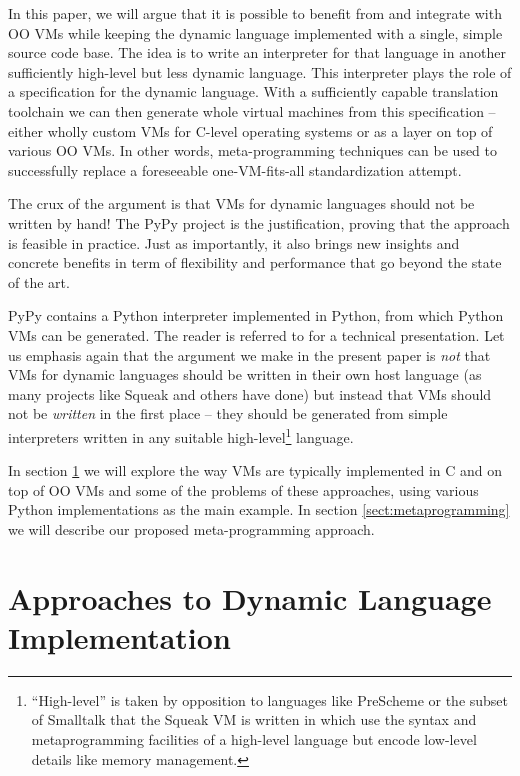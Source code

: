 \documentclass{llncs}
\begin{document}
In this paper, we will argue that it is possible to
benefit from and integrate with OO VMs while keeping the dynamic
language implemented with a single, simple source code base.  The idea is
to write an interpreter for that language in another sufficiently
high-level but less dynamic language.  This interpreter plays the role
of a specification for the dynamic language.  With a sufficiently capable
translation toolchain we can then generate whole virtual machines from
this specification -- either wholly custom VMs for C-level operating
systems or as a layer on top of various OO VMs.  In other words,
meta-programming techniques can be used to successfully replace a
foreseeable one-VM-fits-all standardization attempt.

The crux of the argument is that VMs for dynamic languages should not be
written by hand!  The PyPy project \cite{pypy} is the justification,
proving that the approach is
feasible in practice.  Just as importantly, it also brings new insights
and concrete benefits in term of flexibility and performance that go
beyond the state of the art.

PyPy contains a Python interpreter implemented in Python, from which
Python VMs can be generated.  The reader is referred to
\cite{pypyvmconstruction} for a technical presentation.  Let us emphasis
again that the argument we make in the present paper is \emph{not} that
VMs for dynamic languages should be written in their own host language
(as many projects like Squeak \cite{Squeak} and others have done) but
instead that VMs should not be \emph{written} in the first place -- they
should be generated from simple interpreters written in any suitable
high-level\footnote{``High-level'' is taken by opposition to languages
like PreScheme \cite{kelsey-prescheme} or the subset of Smalltalk that the
Squeak VM is written in \cite{Squeak} which use the syntax and
metaprogramming facilities of a high-level language but encode
low-level details like memory management.} language.

In section \ref{sect:approaches} we will explore the way VMs are typically
implemented in C and on top of OO VMs and some of the problems of these
approaches, using various Python implementations as the main example. In
section \ref{sect:metaprogramming} we will describe our proposed
meta-programming approach.


\section{Approaches to Dynamic Language Implementation}
\label{sect:approaches}
\end{document}
